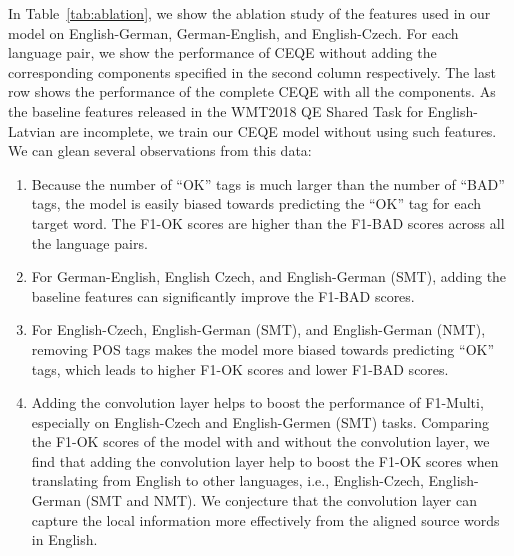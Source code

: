 \documentclass[11pt,a4paper]{article}
\begin{document}
In Table~\ref{tab:ablation}, we show the ablation study of the features used in our model on English-German, German-English, and English-Czech. For each language pair, we show the performance of CEQE without adding the corresponding components specified in the second column respectively. The last row shows the performance of the complete CEQE with all the components. As the baseline features released in the WMT2018 QE Shared Task for English-Latvian are incomplete, we train our CEQE model without using such features. We can glean several observations from this data:
\begin{enumerate}
	\item Because the number of ``OK'' tags is much larger than the number of ``BAD'' tags, the model is easily biased towards predicting the ``OK'' tag for each target word. The F1-OK scores are higher than the F1-BAD scores across all the language pairs.
    \item For German-English, English Czech, and English-German (SMT), adding the baseline features can significantly improve the F1-BAD scores.  
    \item For English-Czech, English-German (SMT), and English-German (NMT), removing POS tags makes the model more biased towards predicting ``OK'' tags, which leads to higher F1-OK scores and lower F1-BAD scores.  
    \item Adding the convolution layer helps to boost the performance of F1-Multi, especially on English-Czech and English-Germen (SMT) tasks. Comparing the F1-OK scores of the model with and without the convolution layer, we find that adding the convolution layer help to boost the F1-OK scores when translating from English to other languages, i.e., English-Czech, English-German (SMT and NMT). We conjecture that the convolution layer can capture the local information more effectively from the aligned source words in English. %
\end{enumerate}
\end{document}
